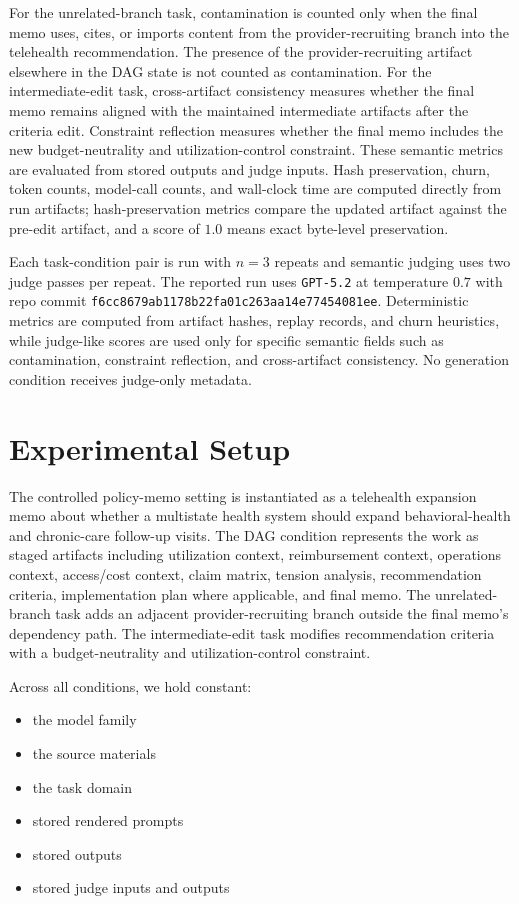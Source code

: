 \documentclass{article}
\begin{document}
For the unrelated-branch task, contamination is counted only when the final memo uses, cites, or imports content from the provider-recruiting branch into the telehealth recommendation. The presence of the provider-recruiting artifact elsewhere in the DAG state is not counted as contamination. For the intermediate-edit task, cross-artifact consistency measures whether the final memo remains aligned with the maintained intermediate artifacts after the criteria edit. Constraint reflection measures whether the final memo includes the new budget-neutrality and utilization-control constraint. These semantic metrics are evaluated from stored outputs and judge inputs. Hash preservation, churn, token counts, model-call counts, and wall-clock time are computed directly from run artifacts; hash-preservation metrics compare the updated artifact against the pre-edit artifact, and a score of $1.0$ means exact byte-level preservation.

Each task-condition pair is run with $n=3$ repeats and semantic judging uses two judge passes per repeat. The reported run uses \texttt{GPT-5.2} at temperature $0.7$ with repo commit \texttt{f6cc8679ab1178b22fa01c263aa14e77454081ee}. Deterministic metrics are computed from artifact hashes, replay records, and churn heuristics, while judge-like scores are used only for specific semantic fields such as contamination, constraint reflection, and cross-artifact consistency. No generation condition receives judge-only metadata.

\section{Experimental Setup}

The controlled policy-memo setting is instantiated as a telehealth expansion memo about whether a multistate health system should expand behavioral-health and chronic-care follow-up visits. The DAG condition represents the work as staged artifacts including utilization context, reimbursement context, operations context, access/cost context, claim matrix, tension analysis, recommendation criteria, implementation plan where applicable, and final memo. The unrelated-branch task adds an adjacent provider-recruiting branch outside the final memo's dependency path. The intermediate-edit task modifies recommendation criteria with a budget-neutrality and utilization-control constraint.

Across all conditions, we hold constant:
\begin{itemize}
\item the model family
\item the source materials
\item the task domain
\item stored rendered prompts
\item stored outputs
\item stored judge inputs and outputs
\end{itemize}
\end{document}

